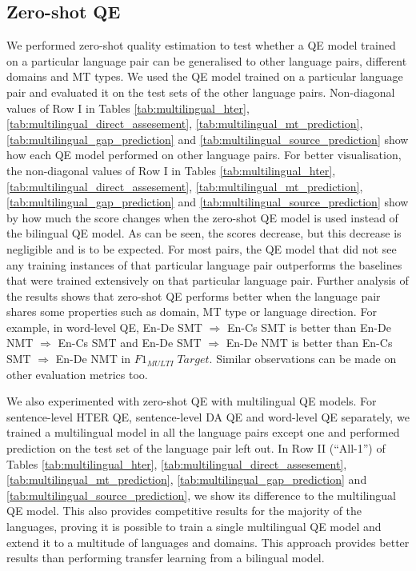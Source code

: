 \subsection{Zero-shot QE}
\label{sec:multilingual_zeroshot}

We performed zero-shot quality estimation to test whether a QE model trained on a particular language pair can be generalised to other language pairs, different domains and MT types. We used the QE model trained on a particular language pair and evaluated it on the test sets of the other language pairs. Non-diagonal values of Row I in Tables  \ref{tab:multilingual_hter}, \ref{tab:multilingual_direct_assesement}, \ref{tab:multilingual_mt_prediction}, \ref{tab:multilingual_gap_prediction} and \ref{tab:multilingual_source_prediction} show how each QE model performed on other language pairs. For better visualisation, the non-diagonal values of Row I in Tables   \ref{tab:multilingual_hter}, \ref{tab:multilingual_direct_assesement}, \ref{tab:multilingual_mt_prediction}, \ref{tab:multilingual_gap_prediction} and \ref{tab:multilingual_source_prediction} show by how much the score changes when the zero-shot QE model is used instead of the bilingual QE model. As can be seen, the scores decrease, but this decrease is negligible and is to be expected. For most pairs, the QE model that did not see any training instances of that particular language pair outperforms the baselines that were trained extensively on that particular language pair. Further analysis of the results shows that zero-shot QE performs better when the language pair shares some properties such as domain, MT type or language direction. For example, in word-level QE, En-De SMT $\Rightarrow$ En-Cs SMT is better than En-De NMT $\Rightarrow$ En-Cs SMT and En-De SMT $\Rightarrow$ En-De NMT is better than En-Cs SMT $\Rightarrow$ En-De NMT in $F1_{\textit{MULTI}} \; Target$. Similar observations can be made on other evaluation metrics too. 

We also experimented with zero-shot QE with multilingual QE models. For sentence-level HTER QE, sentence-level DA QE and word-level QE separately, we trained a multilingual model in all the language pairs except one and performed prediction on the test set of the language pair left out. In Row  II (``All-1'') of Tables \ref{tab:multilingual_hter}, \ref{tab:multilingual_direct_assesement}, \ref{tab:multilingual_mt_prediction}, \ref{tab:multilingual_gap_prediction} and \ref{tab:multilingual_source_prediction}, we show its difference to the multilingual QE model. This also provides competitive results for the majority of the languages, proving it is possible to train a single multilingual QE model and extend it to a multitude of languages and domains. This approach provides better results than performing transfer learning from a bilingual model.

